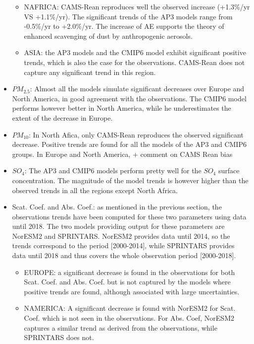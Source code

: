 \documentclass[journal abbreviation, manuscript]{copernicus}
\begin{document}
\begin{itemize}
\begin{itemize}
        \item NAFRICA: CAMS-Rean reproduces well the observed increase (+1.3\%/yr VS +1.1\%/yr). The significant trends of the AP3 models range from -0.5\%/yr to +2.0\%/yr. The increase of AE supports the theory of enhanced scavenging of dust by anthropogenic aerosols.
        \item ASIA: the AP3 models and the CMIP6 model exhibit significant positive trends, which is also the case for the observations. CAMS-Rean does not capture any significant trend in this region.
       \end{itemize}
 \item $PM_{2.5}$: Almost all the models simulate significant decreases over Europe and North America, in good agreement with the observations. The CMIP6 model performs however better in North America, while he underestimates the extent of the decrease in Europe.
 \item $PM_{10}$: In North Afica, only CAMS-Rean reproduces the observed significant decrease. Positive trends are found for all the models of the AP3 and CMIP6 groups. In Europe and North America,  + comment on CAMS Rean bias
 \item $SO_{4}$: The AP3 and CMIP6 models perform pretty well for the $SO_{4}$ surface concentration. The magnitude of the model trends is however higher than the observed trends in all the regions except North Africa.
 \item Scat. Coef. and Abs. Coef.:  as mentioned in the previous section, the observations trends have been computed for these two parameters using data until 2018. The two models providing output for these parameters are NorESM2 and SPRINTARS. NorESM2 provides data until 2014, so the trends correspond to the period [2000-2014], while SPRINTARS provides data until 2018 and thus covers the whole observation period [2000-2018].
       \begin{itemize}
        \item EUROPE: a significant decrease is found in the observations for both Scat. Coef. and Abs. Coef. but is not captured by the models where positive trends are found, although associated with large uncertainties.
        \item NAMERICA: A significant decrease is found with NorESM2 for Scat. Coef. which is not seen in the observations. For Abs. Coef, NorESM2 captures a similar trend as derived from the observations, while SPRINTARS does not.
       \end{itemize}
\end{itemize}
\end{document}
